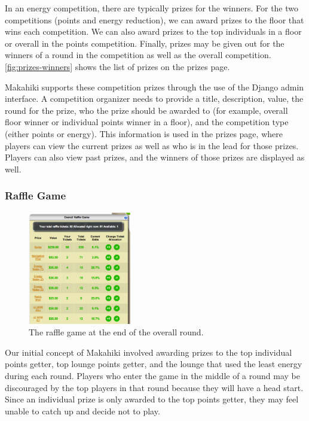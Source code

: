 In an energy competition, there are typically prizes for the winners. For the two competitions (points and energy reduction), we can award prizes to the floor that wins each competition. We can also award prizes to the top individuals in a floor or overall in the points competition. Finally, prizes may be given out for the winners of a round in the competition as well as the overall competition. \autoref{fig:prizes-winners} shows the list of prizes on the prizes page.

Makahiki supports these competition prizes through the use of the Django admin interface. A competition organizer needs to provide a title, description, value, the round for the prize, who the prize should be awarded to (for example, overall floor winner or individual points winner in a floor), and the competition type (either points or energy).  This information is used in the prizes page, where players can view the current prizes as well as who is in the lead for those prizes. Players can also view past prizes, and the winners of those prizes are displayed as well.

\subsubsection{Raffle Game}
\label{pages-prizes:raffle}

\begin{figure}[h]
  \center
  \includegraphics[width=0.4\textwidth]{images/raffle-game.eps}
  \caption{The raffle game at the end of the overall round.}
  \label{fig:raffle-game}
\end{figure}

Our initial concept of Makahiki involved awarding prizes to the top individual points getter, top lounge points getter, and the lounge that used the least energy during each round.  Players who enter the game in the middle of a round may be discouraged by the top players in that round because they will have a head start.  Since an individual prize is only awarded to the top points getter, they may feel unable to catch up and decide not to play.

